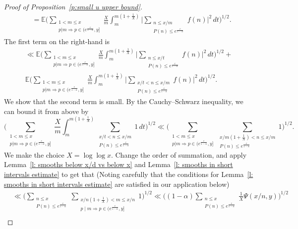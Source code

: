 \documentclass[12pt,a4paper,reqno]{amsart}
\numberwithin{equation}{section}
\def\E{\mathbb E}
\def\leq {\leqslant}
\theoremstyle{remark}
\theoremstyle{definition}
\numberwithin{equation}{section}
\theoremstyle{remark}
\def\E{\mathbb E}
\begin{document}
\begin{proof}[Proof of Proposition~\ref{p:small u upper bound}]
\begin{align*}
& = \E \biggl( \sum_{\substack{1 < m \leq x \\ p | m \Rightarrow p \in (e^{\frac{c}{1-\alpha}}, y]}} \frac{X}{m} \int_{m}^{m(1+\frac{1}{X})} \biggl| \sum_{\substack{n \leq x/m \\ P(n) \leq e^{\frac{c}{1 - \alpha}}}} f(n) \biggr|^2 \, dt \biggr)^{1/2} .
\end{align*}
The first term on the right-hand is
\begin{multline*}
\ll \E \biggl( \sum_{\substack{1 < m \leq x \\ p | m \Rightarrow p \in (e^{\frac{c}{1-\alpha}}, y]}} \frac{X}{m} \int_{m}^{m(1+\frac{1}{X})} \biggl| \sum_{\substack{n \leq x/t \\ P(n) \leq e^{\frac{c}{1 - \alpha}}}} f(n) \biggr|^2 \, dt \biggr)^{1/2} + \\ 
\E \biggl( \sum_{\substack{1 < m \leq x \\ p | m \Rightarrow p \in (e^{\frac{c}{1-\alpha}}, y]}} \frac{X}{m} \int_{m}^{m(1+\frac{1}{X})} \biggl| \sum_{\substack{x/t < n \leq x/m \\ P(n) \leq e^{\frac{c}{1 - \alpha}}}} f(n) \biggr|^2 \, dt \biggr)^{1/2} .
\end{multline*}
We show that the second term is small. By the Cauchy--Schwarz inequality, we can bound it from above by
\[
\biggl( \sum_{\substack{1 < m \leq x \\ p | m \Rightarrow p \in (e^{\frac{c}{1-\alpha}}, y]}} \frac{X}{m} \int_{m}^{m(1+\frac{1}{X})} \sum_{\substack{x/t < n \leq x/m \\ P(n) \leq e^{\frac{c}{1 - \alpha}}}} 1 \, dt \biggr)^{1/2} \ll \biggl( \sum_{\substack{1 < m \leq x \\ p | m \Rightarrow p \in (e^{\frac{c}{1-\alpha}}, y]}} \sum_{\substack{x/m(1 + \frac{1}{X}) < n \leq x/m \\ P(n) \leq e^{\frac{c}{1 - \alpha}}}} 1\biggr)^{1/2}  .
\]
We make the choice $X = \log \log x$. Change the order of summation, and apply Lemma~\ref{l: smooths below x/d vs below x} and Lemma~\ref{l: smooths in short intervals estimate} to get that (Noting carefully that the conditions for Lemma~\ref{l: smooths in short intervals estimate} are satisfied in our application below)
\begin{align*}
& \ll \biggl( \sum_{\substack{n \leq x \\ P(n) \leq e^{\frac{c}{1 - \alpha}}}} \sum_{\substack{x/n(1 + \frac{1}{X}) < m \leq x/n \\ p \mid m \Rightarrow p \in (e^{\frac{c}{1 - \alpha}}, y]}} 1  \biggr)^{1/2} \ll \biggl( (1 - \alpha) \sum_{\substack{n \leq x \\ P(n) \leq e^{\frac{c}{1 - \alpha}}}} \frac{1}{X} \Psi (x/n, y) \biggr)^{1/2} \\

\end{align*}
\end{proof}
\end{document}

